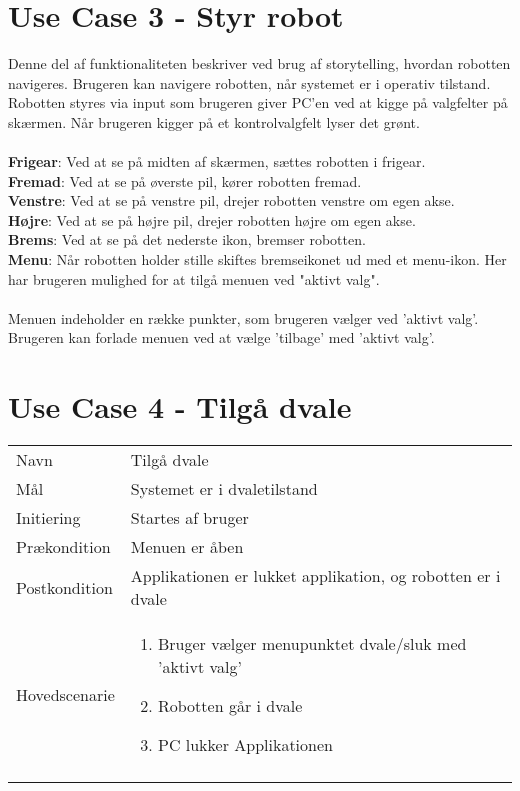\section{Use Case 3 - Styr robot}
Denne del af funktionaliteten beskriver ved brug af storytelling, hvordan robotten navigeres. 
Brugeren kan navigere robotten, når systemet er i operativ tilstand.
Robotten styres via input som brugeren giver PC'en ved at kigge på valgfelter på skærmen. 
Når brugeren kigger på et kontrolvalgfelt lyser det grønt.\\
\\
\textbf{Frigear}: Ved at se på midten af skærmen, sættes robotten i frigear.\\
\textbf{Fremad}: Ved at se på øverste pil, kører robotten fremad.\\
\textbf{Venstre}: Ved at se på venstre pil, drejer robotten venstre om egen akse.\\
\textbf{Højre}: Ved at se på højre pil, drejer robotten højre om egen akse.\\
\textbf{Brems}: Ved at se på det nederste ikon, bremser robotten.\\
\textbf{Menu}: Når robotten holder stille skiftes bremseikonet ud med et menu-ikon. Her har brugeren mulighed for at tilgå menuen ved "aktivt valg".\\
\\
Menuen indeholder en række punkter, som brugeren vælger ved 'aktivt valg'. Brugeren kan forlade menuen ved at vælge 'tilbage' med 'aktivt valg'.
\newpage

\section{Use Case 4 - Tilgå dvale}
\begin{center}
	\begin{tabu} to 1 \textwidth { X[l,1.1]  X[l,3] }
		\tabulinestyle{1pt}
		\tabucline[1pt]{}
		Navn  & Tilgå dvale  \\
		\tabucline[1pt on2pt]{}
		Mål  & Systemet er i dvaletilstand \\
		\tabucline[1pt on2pt]{}
		Initiering  & Startes af bruger  \\
		\tabucline[1pt on2pt]{}
		Prækondition  & Menuen er åben  \\
		\tabucline[1pt on2pt]{}
		Postkondition  & Applikationen er lukket applikation, og robotten er i dvale  \\
		\tabucline[1pt on2pt]{}
		Hovedscenarie  & \begin{enumerate}
			\item Bruger vælger menupunktet dvale/sluk med 'aktivt valg'
			\item Robotten går i dvale		
			\item PC lukker Applikationen
		\end{enumerate}  \\
		\tabucline[1pt]{}	
	\end{tabu}
\end{center}